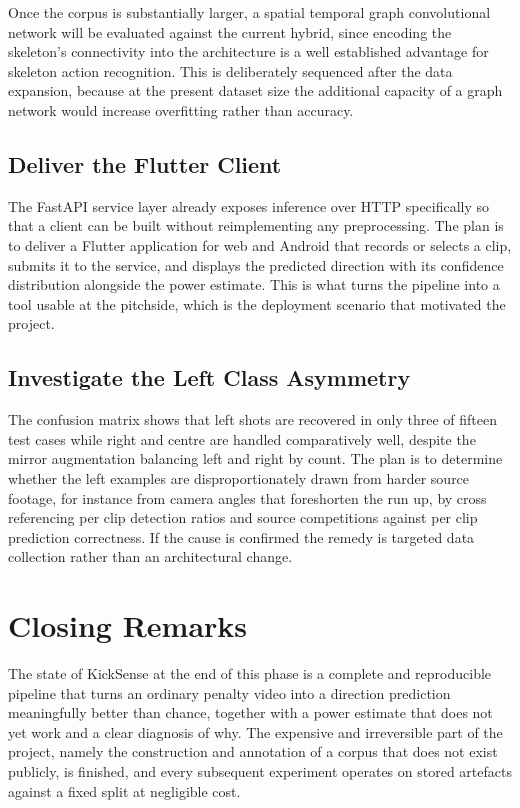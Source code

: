 Once the corpus is substantially larger, a spatial temporal graph convolutional network will be evaluated against the current hybrid, since encoding the skeleton's connectivity into the architecture is a well established advantage for skeleton action recognition. This is deliberately sequenced after the data expansion, because at the present dataset size the additional capacity of a graph network would increase overfitting rather than accuracy.

\subsection{Deliver the Flutter Client}

The FastAPI service layer already exposes inference over HTTP specifically so that a client can be built without reimplementing any preprocessing. The plan is to deliver a Flutter application for web and Android that records or selects a clip, submits it to the service, and displays the predicted direction with its confidence distribution alongside the power estimate. This is what turns the pipeline into a tool usable at the pitchside, which is the deployment scenario that motivated the project.

\subsection{Investigate the Left Class Asymmetry}

The confusion matrix shows that left shots are recovered in only three of fifteen test cases while right and centre are handled comparatively well, despite the mirror augmentation balancing left and right by count. The plan is to determine whether the left examples are disproportionately drawn from harder source footage, for instance from camera angles that foreshorten the run up, by cross referencing per clip detection ratios and source competitions against per clip prediction correctness. If the cause is confirmed the remedy is targeted data collection rather than an architectural change.

\section{Closing Remarks}

The state of KickSense at the end of this phase is a complete and reproducible pipeline that turns an ordinary penalty video into a direction prediction meaningfully better than chance, together with a power estimate that does not yet work and a clear diagnosis of why. The expensive and irreversible part of the project, namely the construction and annotation of a corpus that does not exist publicly, is finished, and every subsequent experiment operates on stored artefacts against a fixed split at negligible cost.

